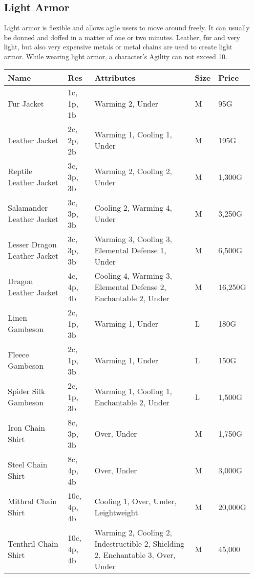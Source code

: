 \subsection{Light Armor}\label{subsec:lightArmor}

Light armor is flexible and allows agile users to move around freely.
It can usually be donned and doffed in a matter of one or two minutes.
Leather, fur and very light, but also very expensive metals or metal chains are used to create light armor.
While wearing light armor, a character's Agility can not exceed 10.

\begin{longtable}{p{3.5cm} | p{1.5cm} | p{5cm} | p{1cm} | p{1.25cm}}
	Name & Res &  Attributes & Size & Price\\ \hline
	Fur Jacket & 1c, 1p, 1b & Warming 2, Under & M & 95G\\
	
	Leather Jacket & 2c, 2p, 2b & Warming 1, Cooling 1, Under & M & 195G\\
	
	Reptile Leather Jacket & 3c, 3p, 3b & Warming 2, Cooling 2, Under & M & 1,300G\\
	
	Salamander Leather Jacket & 3c, 3p, 3b & Cooling 2, Warming 4, Under & M & 3,250G\\
	
	Lesser Dragon Leather Jacket & 3c, 3p, 3b & Warming 3, Cooling 3, Elemental Defense 1, Under & M & 6,500G\\
	
	Dragon Leather Jacket & 4c, 4p, 4b & Cooling 4, Warming 3, Elemental Defense 2, Enchantable 2, Under & M & 16,250G\\
	
	Linen Gambeson & 2c, 1p, 3b & Warming 1, Under & L & 180G\\
	
	Fleece Gambeson & 2c, 1p, 3b & Warming 1, Under & L & 150G\\
	
	Spider Silk Gambeson & 2c, 1p, 3b & Warming 1, Cooling 1, Enchantable 2, Under & L & 1,500G\\
	
	Iron Chain Shirt & 8c, 3p, 3b & Over, Under & M & 1,750G\\
	
	Steel Chain Shirt & 8c, 4p, 4b & Over, Under & M & 3,000G\\
	
	Mithral Chain Shirt & 10c, 4p, 4b & Cooling 1, Over, Under, Leightweight & M & 20,000G\\
	
	Tenthril Chain Shirt & 10c, 4p, 4b & Warming 2, Cooling 2, Indestructible 2, Shielding 2, Enchantable 3, Over, Under & M & 45,000\\
\end{longtable}